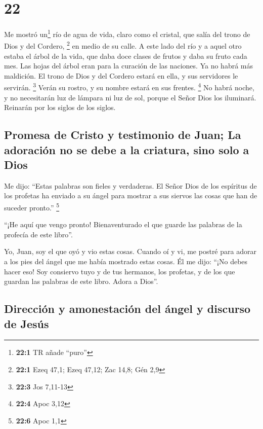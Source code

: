 \hypertarget{section-21}{%
\section{22}\label{section-21}}

 Me mostró un\footnote{\textbf{22:1} TR añade ``puro''}
río de agua de vida, claro como el cristal, que salía del trono de Dios
y del Cordero, \footnote{\textbf{22:1} Ezeq 47,1; Ezeq 47,12; Zac 14,8;
  Gén 2,9}  en medio de su calle. A este lado del río y a
aquel otro estaba el árbol de la vida, que daba doce clases de frutos y
daba su fruto cada mes. Las hojas del árbol eran para la curación de las
naciones.  Ya no habrá más maldición. El trono de Dios y
del Cordero estará en ella, y sus servidores le servirán. \footnote{\textbf{22:3}
  Jos 7,11-13}  Verán su rostro, y su nombre estará en sus
frentes. \footnote{\textbf{22:4} Apoc 3,12}  No habrá
noche, y no necesitarán luz de lámpara ni luz de sol, porque el Señor
Dios los iluminará. Reinarán por los siglos de los siglos.

\hypertarget{promesa-de-cristo-y-testimonio-de-juan-la-adoraciuxf3n-no-se-debe-a-la-criatura-sino-solo-a-dios}{%
\subsection{Promesa de Cristo y testimonio de Juan; La adoración no se
debe a la criatura, sino solo a
Dios}\label{promesa-de-cristo-y-testimonio-de-juan-la-adoraciuxf3n-no-se-debe-a-la-criatura-sino-solo-a-dios}}

 Me dijo: ``Estas palabras son fieles y verdaderas. El
Señor Dios de los espíritus de los profetas ha enviado a su ángel para
mostrar a sus siervos las cosas que han de suceder pronto.'' \footnote{\textbf{22:6}
  Apoc 1,1}

 ``¡He aquí que vengo pronto! Bienaventurado el que guarde
las palabras de la profecía de este libro''.

 Yo, Juan, soy el que oyó y vio estas cosas. Cuando oí y
vi, me postré para adorar a los pies del ángel que me había mostrado
estas cosas.  Él me dijo: ``¡No debes hacer eso! Soy
consiervo tuyo y de tus hermanos, los profetas, y de los que guardan las
palabras de este libro. Adora a Dios''.

\hypertarget{direcciuxf3n-y-amonestaciuxf3n-del-uxe1ngel-y-discurso-de-jesuxfas}{%
\subsection{Dirección y amonestación del ángel y discurso de
Jesús}\label{direcciuxf3n-y-amonestaciuxf3n-del-uxe1ngel-y-discurso-de-jesuxfas}}

